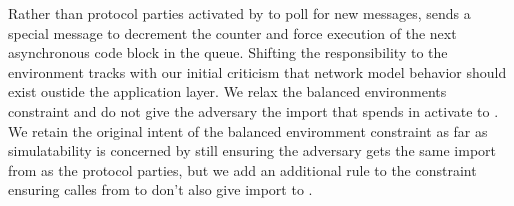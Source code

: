 Rather than protocol parties activated by \Z to poll for new messages, \Z sends a special  message to decrement the counter and force execution of the next asynchronous code block in the queue.
Shifting the responsibility to the environment tracks with our initial criticism that network model behavior should exist oustide the application layer.
We relax the balanced environments constraint and do not give the adversary the import that \Z spends in activate \fwrapper to .
We retain the original intent of the balanced enviromment constraint as far as simulatability is concerned by still ensuring the adversary gets the same import from \Z as the protocol parties, but we add an additional rule to the constraint ensuring  calles from \Z to \F don't also give import to \A.

%
%
%
%
%
%
%

